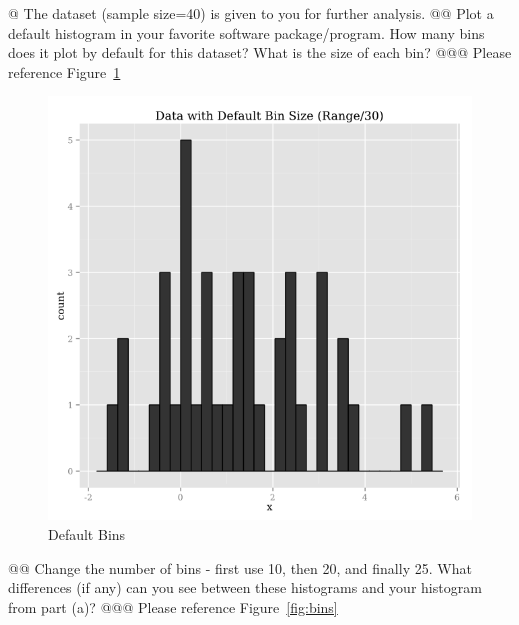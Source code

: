 \documentclass[10pt]{article}
\begin{document}
\begin{easylist}[enumerate]
    @ The dataset (sample size=40) is given to you for further analysis.
    @@ Plot a default histogram in your favorite software package/program. How many bins does it plot by default for this dataset? What is the size of each bin?
    @@@ Please reference Figure~\ref{fig:default}
        \begin{figure}[!ht]
            \centering
            \includegraphics[scale=0.5]{./img/5a.png}
            \caption{Default Bins}
            \label{fig:default}
        \end{figure}
    @@ Change the number of bins - first use 10, then 20, and finally 25. What differences (if any) can you see between these histograms and your histogram from part (a)?
    @@@ Please reference Figure~\ref{fig:bins}
        \begin{figure}[!ht]
            \centering

\end{figure}
\end{easylist}
\end{document}
